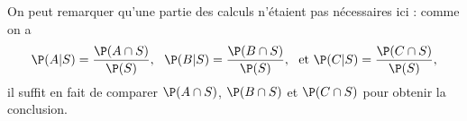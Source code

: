 {{    On peut remarquer qu'une partie des calculs n'étaient pas nécessaires ici : comme on a 
        $$\P(A|S) = \frac {\P(A\cap S)}{\P(S)},~~ \P(B|S) = \frac {\P(B\cap S)}{\P(S)},
            ~~ \text{et } \P(C|S) = \frac {\P(C\cap S)}{\P(S)},$$
    il suffit en fait de comparer $\P(A\cap S)$, $\P(B\cap S)$ et $\P(C\cap S)$ pour obtenir la conclusion.}
}